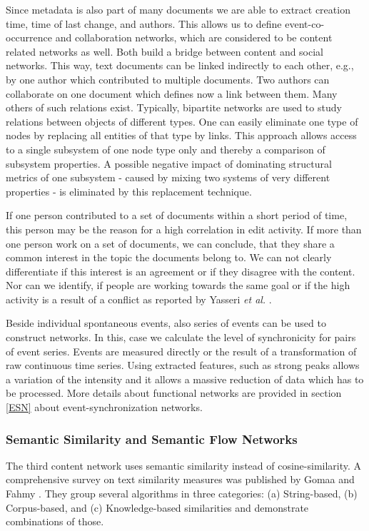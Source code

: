 \documentclass[a4paper,10pt]{scrbook}
\begin{document}
Since metadata is also part of many documents we are able to extract creation time, time of last change, and authors. This allows us to define event-co-occurrence and collaboration networks, which are considered to be content related networks as well. Both build a bridge between content and social networks. This way, text documents can be linked indirectly to each other, e.g., by one author which contributed to multiple documents. Two authors can collaborate on one document which defines now a link between them. Many others of such relations exist. Typically, bipartite networks are used to study relations between objects of different types. One can easily eliminate one type of nodes by replacing all entities of that type by links. This approach allows access to a single subsystem of one node type only and thereby a comparison of subsystem properties. A possible negative impact of dominating structural metrics of one subsystem - caused by mixing two systems of very different properties - is eliminated by this replacement technique. 

If one person contributed to a set of documents within a short period of time, this person may be the reason for a high correlation in edit activity. If more than one person work on a set of documents, we can conclude, that they share a common interest in the topic the documents belong to. We can not clearly differentiate if this interest is an agreement or if they disagree with the content. Nor can we identify, if people are working towards the same goal or if the high activity is a result of a conflict as reported by Yasseri \textit{et al.} \cite{Yasseri2012b}. 

Beside individual spontaneous events, also series of events can be used to construct networks. In this, case we calculate the level of synchronicity for pairs of event series. Events are measured directly or the result of a transformation of raw continuous time series. Using extracted features, such as strong peaks allows a variation of the intensity  and it allows a massive reduction of data which has to be processed. More details about functional networks are provided in section \ref{ESN} about event-synchronization networks. 

\subsubsection*{Semantic Similarity and Semantic Flow Networks}
\label{sem.sim} 
The third content network uses semantic similarity instead of cosine-similarity. A comprehensive survey on text similarity measures was published by Gomaa and Fahmy \cite{Gomaa2013}.	They group several algorithms in three categories: (a) String-based, (b) Corpus-based, and (c) Knowledge-based similarities and demonstrate combinations of those.
\end{document}
